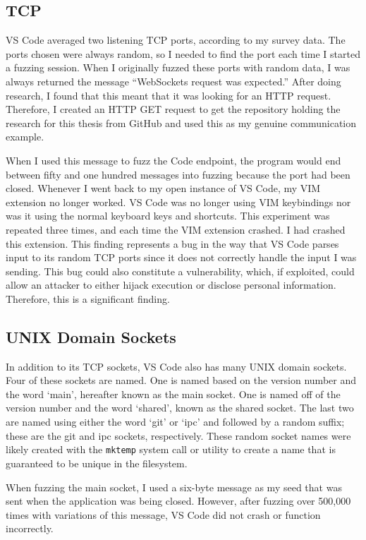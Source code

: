 \subsection{TCP}
\label{sec:codeTcp}
VS Code averaged two listening TCP ports, according to my survey data.  The ports chosen were always random, so I needed to find the port each time I started a fuzzing session.  When I originally fuzzed these ports with random data, I was always returned the message ``WebSockets request was expected.''  After doing research, I found that this meant that it was looking for an HTTP request.  Therefore, I created an HTTP GET request to get the repository holding the research for this thesis from GitHub and used this as my genuine communication example.

When I used this message to fuzz the Code endpoint, the program would end between fifty and one hundred messages into fuzzing because the port had been closed.  Whenever I went back to my open instance of VS Code, my VIM extension no longer worked.  VS Code was no longer using VIM keybindings nor was it using the normal keyboard keys and shortcuts.  This experiment was repeated three times, and each time the VIM extension crashed.  I had crashed this extension.  This finding represents a bug in the way that VS Code parses input to its random TCP ports since it does not correctly handle the input I was sending.  This bug could also constitute a vulnerability, which, if exploited, could allow an attacker to either hijack execution or disclose personal information.  Therefore, this is a significant finding.

\subsection{UNIX Domain Sockets}
\label{sec:codeUnix}
In addition to its TCP sockets, VS Code also has many UNIX domain sockets.  Four of these sockets are named.  One is named based on the version number and the word `main', hereafter known as the main socket.  One is named off of the version number and the word `shared', known as the shared socket.  The last two are named using either the word `git' or `ipc' and followed by a random suffix; these are the git and ipc sockets, respectively.  These random socket names were likely created with the \texttt{mktemp} system call or utility to create a name that is guaranteed to be unique in the filesystem.

When fuzzing the main socket, I used a six-byte message as my seed that was sent when the application was being closed.  However, after fuzzing over 500,000 times with variations of this message, VS Code did not crash or function incorrectly.


